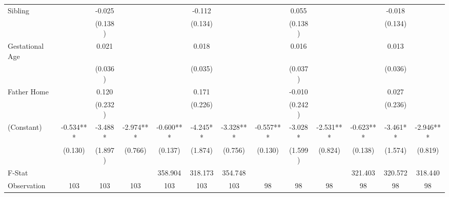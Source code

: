 \begin{tabular}{lcccccccccccc}
Sibling &  & -0.025 &  &  & -0.112 &  &  & 0.055 &  &  & -0.018 &  \\
 &  & (0.138) &  &  & (0.134) &  &  & (0.138) &  &  & (0.134) &  \\
Gestational Age &  & 0.021 &  &  & 0.018 &  &  & 0.016 &  &  & 0.013 &  \\
 &  & (0.036) &  &  & (0.035) &  &  & (0.037) &  &  & (0.036) &  \\
Father Home &  & 0.120 &  &  & 0.171 &  &  & -0.010 &  &  & 0.027 &  \\
 &  & (0.232) &  &  & (0.226) &  &  & (0.242) &  &  & (0.236) &  \\
(Constant) & -0.534*** & -3.488* & -2.974*** & -0.600*** & -4.245** & -3.328*** & -0.557*** & -3.028* & -2.531*** & -0.623*** & -3.461** & -2.946*** \\
 & (0.130) & (1.897) & (0.766) & (0.137) & (1.874) & (0.756) & (0.130) & (1.599) & (0.824) & (0.138) & (1.574) & (0.819) \\
\midrule 
F-Stat &  &  &  & 358.904 & 318.173 & 354.748 &  &  &  & 321.403 & 320.572 & 318.440 \\
Observation & 103 & 103 & 103 & 103 & 103 & 103 & 98 & 98 & 98 & 98 & 98 & 98 \\
\midrule 
\bottomrule 
\end{tabular}
